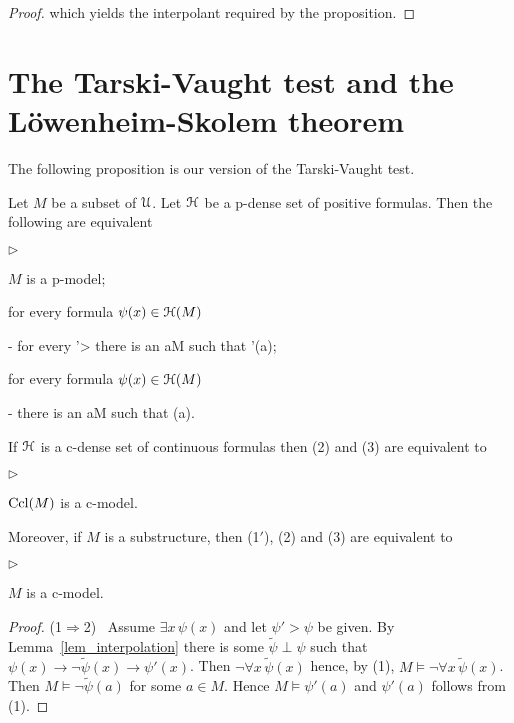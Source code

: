\documentclass{amsproc}
\newcommand{\mylabel}[1]{{#1}\hfill}
\renewenvironment{itemize}
  {\begin{list}{$\triangleright$}{%
  \setlength{\parskip}{0mm}
  \setlength{\topsep}{.4\baselineskip}
  \setlength{\rightmargin}{0mm}
  \setlength{\listparindent}{0mm}
  \setlength{\itemindent}{0mm}
  \setlength{\labelwidth}{3ex}
  \setlength{\itemsep}{.2\baselineskip}
  \setlength{\parsep}{.2\baselineskip}
  \setlength{\partopsep}{0mm}
  \setlength{\labelsep}{1ex}
  \setlength{\leftmargin}{\labelwidth+\labelsep}
  \let\makelabel\mylabel}}{%
\end{list}}
\begin{document}
{\begin{proof}
  which yields the interpolant required by the proposition.
\end{proof}

\section{The Tarski-Vaught test and the L\"owenheim-Skolem theorem}

The following proposition is our version of the Tarski-Vaught test.

\begin{theorem}\label{thm_Tarski_Vaught}
  Let $M$ be a subset of ${\EuScript U}$.
  Let ${\EuScript H}$ be a p-dense set of positive formulas.
  Then the following are equivalent
  \begin{itemize}
    \item[1.] $M$ is a p-model;
    \item[2.] for every formula $\psi(x)\in{\EuScript H}(M)$
    
    \noindent\kern-\leftmargin
    {\textrm{ for every }\psi'>\psi\textrm{ there is an }a\in M\textrm{ such that }\psi'(a);}
  
    \item[3.] for every formula $\psi(x)\in{\EuScript H}(M)$
    
    \noindent\kern-\leftmargin
    {\textrm{ there is an }a\in M\textrm{ such that }\neg\psi(a).}
  \end{itemize}
  If ${\EuScript H}$ is a c-dense set of continuous formulas then (2) and (3) are equivalent to
  \begin{itemize}
    \item[1$'$.] ${\rm Ccl}(M)$ is a c-model.
  \end{itemize}
  Moreover, if $M$ is a substructure, then (1$'$), (2) and (3) are equivalent to
  \begin{itemize}
    \item[1$''$.] $M$ is a c-model.
  \end{itemize}
\end{theorem}

\begin{proof}
  (1$\Rightarrow$2) \ 
  Assume $\exists x\,\psi(x)$ and let $\psi'>\psi$ be given.
  By Lemma~\ref{lem_interpolation} there is some $\tilde{\psi}\perp\psi$ such that  $\psi(x)\rightarrow\neg\tilde{\psi}(x)\rightarrow\psi'(x)$.
  Then $\neg\forall x\,\tilde{\psi}(x)$ hence, by (1), $M\models\neg\forall x\,\tilde{\psi}(x)$.
  Then $M\models\neg\tilde{\psi}(a)$ for some $a\in M$. Hence $M\models\psi'(a)$ and $\psi'(a)$ follows from (1).


\end{proof}}
\end{document}
